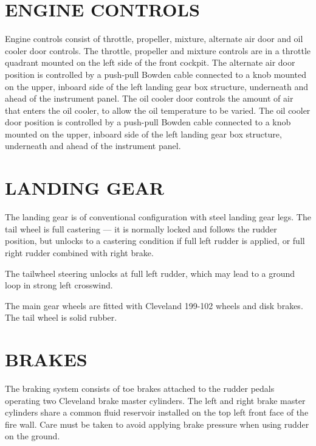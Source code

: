 \section{ENGINE CONTROLS} Engine controls consist of throttle, propeller, mixture, alternate air door and oil cooler door controls. The throttle, propeller and mixture controls are in a throttle quadrant mounted on the left side of the front cockpit. The alternate air door position is controlled by a push-pull Bowden cable connected to a knob mounted on the upper, inboard side of the left landing gear box structure, underneath and ahead of the instrument panel. The oil cooler door controls the amount of air that enters the oil cooler, to allow the oil temperature to be varied. The oil cooler door position is controlled by a push-pull Bowden cable connected to a knob mounted on the upper, inboard side of the left landing gear box structure, underneath and ahead of the instrument panel.

\section{LANDING GEAR} The landing gear is of conventional configuration with steel landing gear legs. The tail wheel is full castering --- it is normally locked and follows the rudder position, but unlocks to a castering condition if full left rudder is applied, or full right rudder combined with right brake.

\begin{Note}[CAUTION]
The tailwheel steering unlocks at full left rudder, which may lead to a ground loop in strong left crosswind.\end{Note}

The main gear wheels are fitted with Cleveland 199-102 wheels and disk brakes. The tail wheel is solid rubber.

\section{BRAKES} The braking system consists of toe brakes attached to the rudder pedals operating two Cleveland brake master cylinders. The left and right brake master cylinders share a common fluid reservoir installed on the top left front face of the fire wall. Care must be taken to avoid applying brake pressure when using rudder on the ground.

